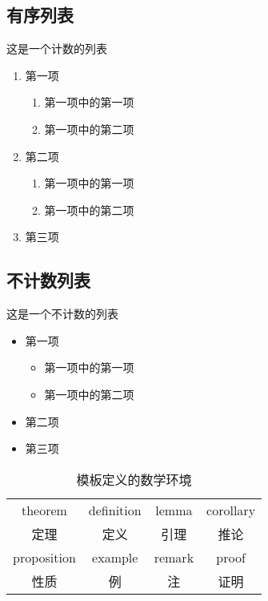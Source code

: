 \subsection{有序列表}
这是一个计数的列表
\begin{enumerate}
  \item 第一项
        \begin{enumerate}
          \item 第一项中的第一项
          \item 第一项中的第二项
        \end{enumerate}
  \item 第二项
        \begin{enumerate}[label=(\roman*)]
          \item 第一项中的第一项
          \item 第一项中的第二项
        \end{enumerate}
  \item 第三项
\end{enumerate}

\subsection{不计数列表}
这是一个不计数的列表
\begin{itemize}
  \item 第一项
        \begin{itemize}
          \item 第一项中的第一项
          \item 第一项中的第二项
        \end{itemize}
  \item 第二项
  \item 第三项
\end{itemize}

\begin{table}[b]
  \caption{模板定义的数学环境}\label{tab:数学环境}
  \begin{tabularx}{\textwidth}{CCCC}
    \toprule
    theorem     & definition & lemma  & corollary \\
    定理        & 定义       & 引理   & 推论      \\
    \midrule
    proposition & example    & remark & proof     \\
    性质        & 例         & 注     & 证明      \\
    \bottomrule
  \end{tabularx}
\end{table}

